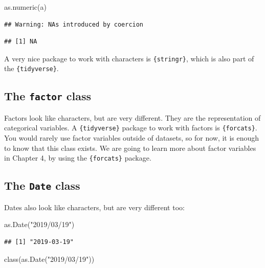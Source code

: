 \documentclass[
]{article}
\newenvironment{Shaded}{\begin{snugshade}}{\end{snugshade}}
\newcommand{\FunctionTok}[1]{\textcolor[rgb]{0.00,0.00,0.00}{#1}}
\newcommand{\NormalTok}[1]{#1}
\newcommand{\StringTok}[1]{\textcolor[rgb]{0.31,0.60,0.02}{#1}}
\begin{document}
\begin{Shaded}
\begin{Highlighting}[]
\FunctionTok{as.numeric}\NormalTok{(a)}
\end{Highlighting}
\end{Shaded}

\begin{verbatim}
## Warning: NAs introduced by coercion
\end{verbatim}

\begin{verbatim}
## [1] NA
\end{verbatim}

A very nice package to work with characters is \texttt{\{stringr\}}, which is also part of the \texttt{\{tidyverse\}}.

\hypertarget{the-factor-class}{%
\subsection{\texorpdfstring{The \texttt{factor} class}{The factor class}}\label{the-factor-class}}

Factors look like characters, but are very different. They are the representation of categorical
variables. A \texttt{\{tidyverse\}} package to work with factors is \texttt{\{forcats\}}. You would rarely use
factor variables outside of datasets, so for now, it is enough to know that this class exists.
We are going to learn more about factor variables in Chapter 4, by using the \texttt{\{forcats\}} package.

\hypertarget{the-date-class}{%
\subsection{\texorpdfstring{The \texttt{Date} class}{The Date class}}\label{the-date-class}}

Dates also look like characters, but are very different too:

\begin{Shaded}
\begin{Highlighting}[]
\FunctionTok{as.Date}\NormalTok{(}\StringTok{"2019/03/19"}\NormalTok{)}
\end{Highlighting}
\end{Shaded}

\begin{verbatim}
## [1] "2019-03-19"
\end{verbatim}

\begin{Shaded}
\begin{Highlighting}[]
\FunctionTok{class}\NormalTok{(}\FunctionTok{as.Date}\NormalTok{(}\StringTok{"2019/03/19"}\NormalTok{))}
\end{Highlighting}
\end{Shaded}
\end{document}
